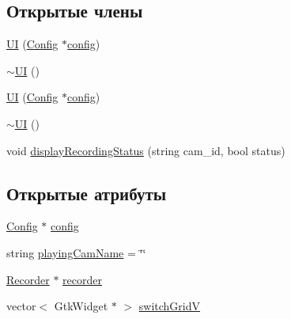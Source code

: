 \subsection*{Открытые члены}
\begin{DoxyCompactItemize}
\item 
\hyperlink{class_u_i_a2b49119b809785f66dd97ce769ab1753}{UI} (\hyperlink{class_config}{Config} $\ast$\hyperlink{class_u_i_a6966022e569960221b61ea4f0111a484}{config})
\item 
\hyperlink{class_u_i_a1b23d0c64c7cbb3d143d90ec532a7ccd}{$\sim$\+UI} ()
\item 
\hyperlink{class_u_i_a2b49119b809785f66dd97ce769ab1753}{UI} (\hyperlink{class_config}{Config} $\ast$\hyperlink{class_u_i_a6966022e569960221b61ea4f0111a484}{config})
\item 
\hyperlink{class_u_i_a1b23d0c64c7cbb3d143d90ec532a7ccd}{$\sim$\+UI} ()
\item 
void \hyperlink{class_u_i_ad860928c87b2a7f4e18b3f6e15774dd3}{display\+Recording\+Status} (string cam\+\_\+id, bool status)
\end{DoxyCompactItemize}
\subsection*{Открытые атрибуты}
\begin{DoxyCompactItemize}
\item 
\hyperlink{class_config}{Config} $\ast$ \hyperlink{class_u_i_a6966022e569960221b61ea4f0111a484}{config}
\item 
string \hyperlink{class_u_i_a519609c35edd6f678d5d78fe88fac888}{playing\+Cam\+Name} = \char`\"{}\char`\"{}
\item 
\hyperlink{class_recorder}{Recorder} $\ast$ \hyperlink{class_u_i_aa857564b96618cd520b18b9c0ef95f00}{recorder}
\item 
vector$<$ Gtk\+Widget $\ast$ $>$ \hyperlink{class_u_i_a6e64500f18e96ae92dc4f584f37dfc4f}{switch\+GridV}
\end{DoxyCompactItemize}

